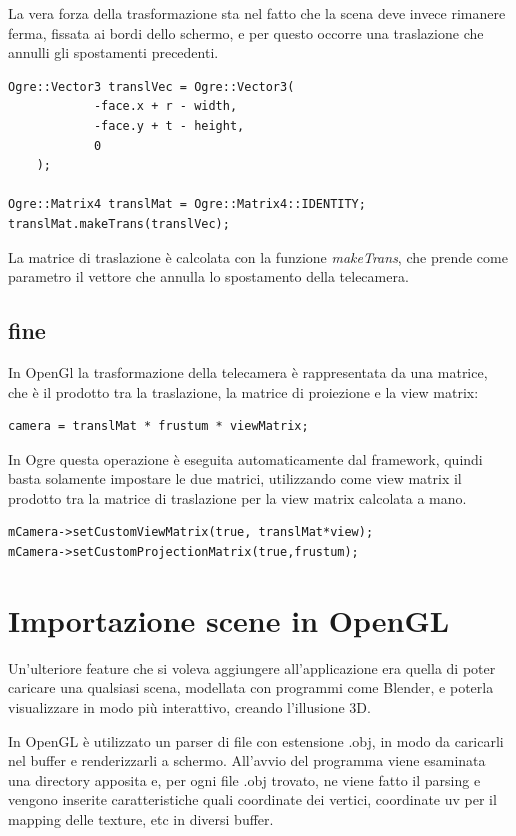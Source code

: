 La vera forza della trasformazione sta nel fatto che la scena deve invece rimanere ferma, fissata ai bordi dello schermo, e per questo occorre una traslazione che annulli gli spostamenti precedenti.



\begin{lstlisting}
Ogre::Vector3 translVec = Ogre::Vector3(
            -face.x + r - width,
            -face.y + t - height,
            0
    );

Ogre::Matrix4 translMat = Ogre::Matrix4::IDENTITY;
translMat.makeTrans(translVec);
\end{lstlisting}
La matrice di traslazione è calcolata con la funzione \textit{makeTrans}, che prende come parametro il vettore che annulla lo spostamento della telecamera.

\subsection{fine}
In OpenGl la trasformazione della telecamera è rappresentata da una matrice, che è il prodotto tra la traslazione, la matrice di proiezione e la view matrix:
\begin{lstlisting}
camera = translMat * frustum * viewMatrix;
\end{lstlisting}
In Ogre questa operazione è eseguita automaticamente dal framework, quindi basta solamente impostare le due matrici, utilizzando come view matrix il prodotto tra la matrice di traslazione per la view matrix calcolata a mano.
\begin{lstlisting}
mCamera->setCustomViewMatrix(true, translMat*view);
mCamera->setCustomProjectionMatrix(true,frustum);
\end{lstlisting}



\section{Importazione scene in OpenGL}
Un'ulteriore feature che si voleva aggiungere all'applicazione era quella di poter caricare una qualsiasi scena, modellata con programmi come Blender, e poterla visualizzare in modo più interattivo, creando l'illusione 3D.

In OpenGL è utilizzato un parser di file con estensione .obj, in modo da caricarli nel buffer e renderizzarli a schermo. All'avvio del programma viene esaminata una directory apposita e, per ogni file .obj trovato, ne viene fatto il parsing e vengono inserite caratteristiche quali coordinate dei vertici, coordinate uv per il mapping delle texture, etc in diversi buffer.

